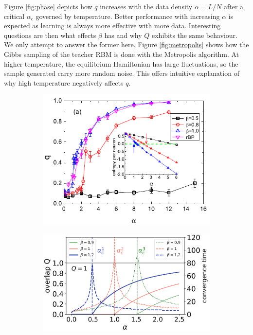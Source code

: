 \documentclass[%
 reprint,
 amsmath,amssymb,
 aps,
]{revtex4-2}
\begin{document}
Figure \ref{fig:phase} depicts how $q$ increases with the data density $\alpha=L/N$ after a critical $\alpha_c$ governed by temperature. Better performance with increasing $\alpha$ is expected as learning is always more effective with more data. Interesting questions are then what effects $\beta$ has and why $Q$ exhibits the same behaviour. We only attempt to answer the former here. Figure \ref{fig:metropolis} shows how the Gibbs sampling of the teacher RBM is done with the Metropolis algorithm. At higher temperature, the equilibrium Hamiltonian has large fluctuations, so the sample generated carry more random noise. This offers intuitive explanation of why high temperature negatively affects $q$.
\begin{figure}[]
\begin{subfigure}{0.49\columnwidth}
\includegraphics[width=\linewidth]{q against alpha.png}
\subcaption{}
\end{subfigure}
\begin{subfigure}{0.49\columnwidth}
\includegraphics[width=\linewidth]{big Q against alpha.png}

\end{subfigure}
\end{figure}
\end{document}
